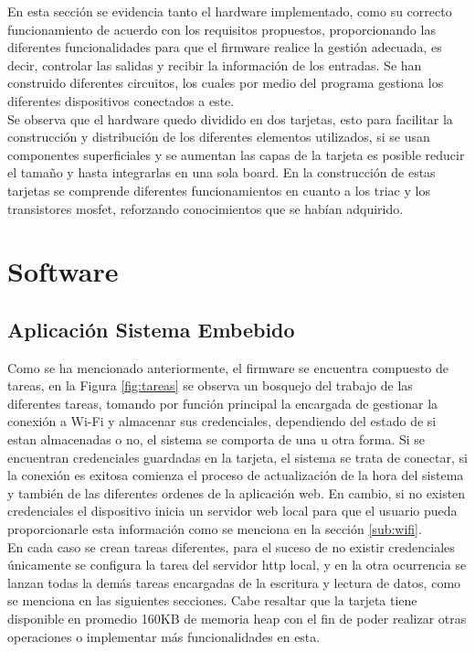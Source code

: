 En esta sección se evidencia tanto el hardware implementado, como su correcto funcionamiento de acuerdo con los requisitos propuestos, proporcionando las diferentes funcionalidades para que el firmware realice la gestión adecuada, es decir, controlar las salidas y recibir la información de los entradas. Se han construido diferentes circuitos, los cuales por medio del programa gestiona los diferentes dispositivos conectados a este.\\

Se observa que el hardware quedo dividido en dos tarjetas, esto para facilitar la construcción y distribución de los diferentes elementos utilizados, si se usan componentes superficiales y se aumentan las capas de la tarjeta es posible reducir el tamaño y hasta integrarlas en una sola board. En la construcción de estas tarjetas se comprende diferentes funcionamientos en cuanto a los triac y los transistores mosfet, reforzando conocimientos que se habían adquirido.\\

\section{Software}

\subsection{Aplicación Sistema Embebido} %

Como se ha mencionado anteriormente, el firmware se encuentra compuesto de tareas, en la Figura \ref{fig:tareas} se observa un bosquejo del trabajo de las diferentes tareas, tomando por función principal la encargada de gestionar la conexión a Wi-Fi y almacenar sus credenciales, dependiendo del estado de si estan almacenadas o no, el sistema se comporta de una u otra forma. Si se encuentran credenciales guardadas en la tarjeta, el sistema se trata de conectar, si la conexión es exitosa comienza el proceso de actualización de la hora del sistema y también de las diferentes ordenes de la aplicación web. En cambio, si no existen credenciales el dispositivo inicia un servidor web local para que el usuario pueda proporcionarle esta información como se menciona en la sección \ref{sub:wifi}.\\

En cada caso se crean tareas diferentes, para el suceso de no existir credenciales únicamente se configura la tarea del servidor http local, y en la otra ocurrencia se lanzan todas la demás tareas encargadas de la escritura y lectura de datos, como se menciona en las siguientes secciones. Cabe resaltar que la tarjeta tiene disponible en promedio 160KB de memoria heap con el fin de poder realizar otras operaciones o implementar más funcionalidades en esta.\\

